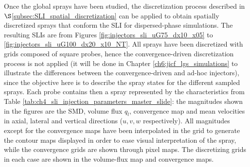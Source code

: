 


\newcommand\scaleSLIBIMER{0.15}



Once the global sprays have been studied, the discretization process described in $\S$\ref{subsec:SLI_spatial_discretization} can be applied to obtain spatially discretized sprays that conform the SLI for dispersed-phase simulations. The resulting SLIs are from Figures \ref{fig:injectors_sli_uG75_dx10_x05} to \ref{fig:injectors_sli_uG100_dx20_x10_NT}. All sprays have been discretized with grids composed of square probes, hence the convergence-driven discretization process is not applied (it will be done in Chapter \ref{ch6:jicf_lgs_simulations} to illustrate the differences between the convergence-driven and ad-hoc injectors), since the objective here is to describe the spray states for the different sampled sprays. Each probe contains then a spray represented by the characteristics from Table \ref{tab:ch4_sli_injection_parameters_master_slide}: the magnitudes shown in the figures are the SMD, volume flux $q_l$, convergence map and mean velocities in axial, lateral and vertical directions ($u, v, w$ respectively). All magnitudes except for the convergence maps have been interpolated in the grid to generate the contour maps displayed in order to ease visual interpretation of the spray, while the convergence grids are shown through pixel maps. The discretizing grids in each case are shown in the volume-flux map and convergence maps.

